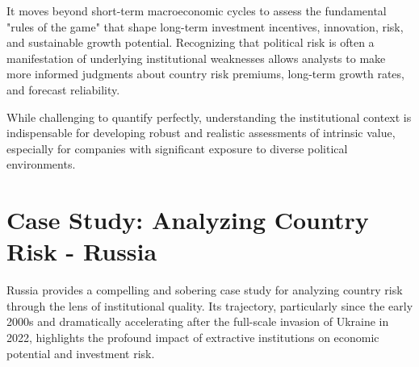 It moves beyond short-term macroeconomic cycles to assess the fundamental "rules of the game" that shape long-term investment incentives, innovation, risk, and sustainable growth potential. Recognizing that political risk is often a manifestation of underlying institutional weaknesses allows analysts to make more informed judgments about country risk premiums, long-term growth rates, and forecast reliability. 

While challenging to quantify perfectly, understanding the institutional context is indispensable for developing robust and realistic assessments of intrinsic value, especially for companies with significant exposure to diverse political environments.

\section{Case Study: Analyzing Country Risk - Russia}
\label{sec:case_study_russia}

Russia provides a compelling and sobering case study for analyzing country risk through the lens of institutional quality. Its trajectory, particularly since the early 2000s and dramatically accelerating after the full-scale invasion of Ukraine in 2022, highlights the profound impact of extractive institutions on economic potential and investment risk.


